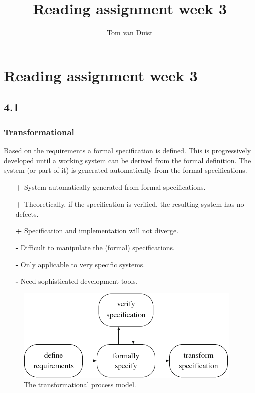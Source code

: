 

\title{Reading assignment week 3}
\newcommand{\TitelAbbr}{}
\newcommand{\Version}{0.1}



\what{}
\supervisors{}
\author{Tom van Duist}




\maketitle
\clearpage


\chapter*{Reading assignment week 3}

\section*{4.1}

\subsection*{Transformational \cite{req_en_book}}
Based on the requirements a formal specification is defined. This is progressively developed until a working system can be derived from the formal definition. The system (or part of it) is generated automatically from the formal specifications.
\begin{itemize}
	\item[\textbf{+}] System automatically generated from formal specifications.
	\item[\textbf{+}] Theoretically, if the specification is verified, the resulting system has no defects.
	\item[\textbf{+}] Specification and implementation will not diverge.
	\item[\textbf{-}] Difficult to manipulate the (formal) specifications.
	\item[\textbf{-}] Only applicable to very specific systems.
	\item[\textbf{-}] Need sophisticated development tools.
\end{itemize}
\begin{figure}[h]
	\centering
	\includegraphics[width=0.75\linewidth]{Resources/4_transformational.png}
	\caption{The transformational process model.}
	\label{fig:transformational}
\end{figure} 

